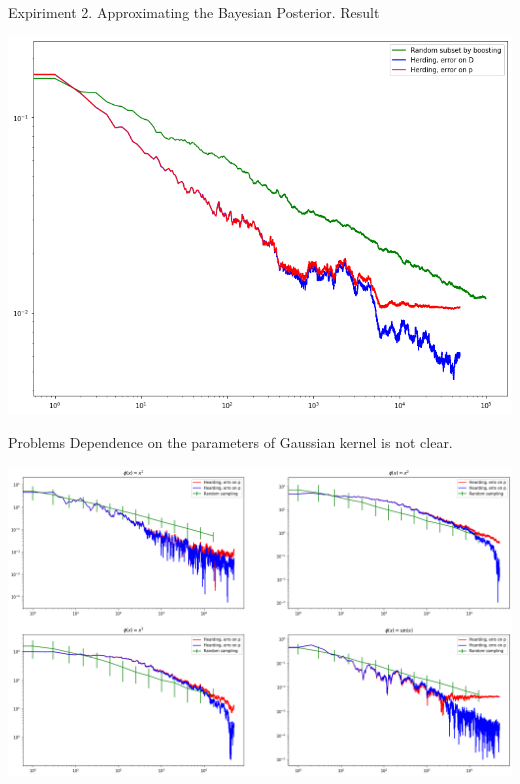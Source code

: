 \documentclass{beamer}
\begin{document}
\begin{frame}{Expiriment 2. Approximating the Bayesian Posterior. Result}
    \begin{center}
        \includegraphics[width=.8\textwidth]{imgs/exp3}
    \end{center}
\end{frame}

\begin{frame}{Problems}
    Dependence on the parameters of Gaussian kernel is not clear.
    \begin{center}
        \includegraphics[width=.8\textwidth]{imgs/bad}
    \end{center}
\end{frame}
\end{document}
